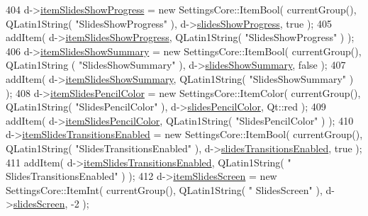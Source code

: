 \begin{DoxyCode}
404   d->\hyperlink{classOkular_1_1SettingsPrivate_aa017e69102f9826cab17015728a06d0e}{itemSlidesShowProgress} = \textcolor{keyword}{new} SettingsCore::ItemBool( currentGroup(), 
      QLatin1String( \textcolor{stringliteral}{"SlidesShowProgress"} ), d->\hyperlink{classOkular_1_1SettingsPrivate_a9f7e1778a473ab4fca45f816a21d1254}{slidesShowProgress}, \textcolor{keyword}{true} );
405   addItem( d->\hyperlink{classOkular_1_1SettingsPrivate_aa017e69102f9826cab17015728a06d0e}{itemSlidesShowProgress}, QLatin1String( \textcolor{stringliteral}{"SlidesShowProgress"} ) );
406   d->\hyperlink{classOkular_1_1SettingsPrivate_a3cc39edeb6b2f692db32b97836ad4c95}{itemSlidesShowSummary} = \textcolor{keyword}{new} SettingsCore::ItemBool( currentGroup(), QLatin1String
      ( \textcolor{stringliteral}{"SlidesShowSummary"} ), d->\hyperlink{classOkular_1_1SettingsPrivate_a15e8ffa873a442611e65c8a00c342c8f}{slidesShowSummary}, \textcolor{keyword}{false} );
407   addItem( d->\hyperlink{classOkular_1_1SettingsPrivate_a3cc39edeb6b2f692db32b97836ad4c95}{itemSlidesShowSummary}, QLatin1String( \textcolor{stringliteral}{"SlidesShowSummary"} ) );
408   d->\hyperlink{classOkular_1_1SettingsPrivate_a4d6faac7ea37d6afa709d3e4ed5f28b0}{itemSlidesPencilColor} = \textcolor{keyword}{new} SettingsCore::ItemColor( currentGroup(), 
      QLatin1String( \textcolor{stringliteral}{"SlidesPencilColor"} ), d->\hyperlink{classOkular_1_1SettingsPrivate_af415c5e60b769ab43abd82ff9925be41}{slidesPencilColor}, Qt::red );
409   addItem( d->\hyperlink{classOkular_1_1SettingsPrivate_a4d6faac7ea37d6afa709d3e4ed5f28b0}{itemSlidesPencilColor}, QLatin1String( \textcolor{stringliteral}{"SlidesPencilColor"} ) );
410   d->\hyperlink{classOkular_1_1SettingsPrivate_aa0f6efe7077aeadbdbcbfa55afbf59e4}{itemSlidesTransitionsEnabled} = \textcolor{keyword}{new} SettingsCore::ItemBool( currentGroup(),
       QLatin1String( \textcolor{stringliteral}{"SlidesTransitionsEnabled"} ), d->\hyperlink{classOkular_1_1SettingsPrivate_a7d05aafe4b651b151b139b0bfc23aa07}{slidesTransitionsEnabled}, \textcolor{keyword}{true} );
411   addItem( d->\hyperlink{classOkular_1_1SettingsPrivate_aa0f6efe7077aeadbdbcbfa55afbf59e4}{itemSlidesTransitionsEnabled}, QLatin1String( \textcolor{stringliteral}{"
      SlidesTransitionsEnabled"} ) );
412   d->\hyperlink{classOkular_1_1SettingsPrivate_af4950dce8d281ec9e8531fed303d3851}{itemSlidesScreen} = \textcolor{keyword}{new} SettingsCore::ItemInt( currentGroup(), QLatin1String( \textcolor{stringliteral}{"
      SlidesScreen"} ), d->\hyperlink{classOkular_1_1SettingsPrivate_a0889218d8b0d45ad198dc4535ecfe0ca}{slidesScreen}, -2 );

\end{DoxyCode}
